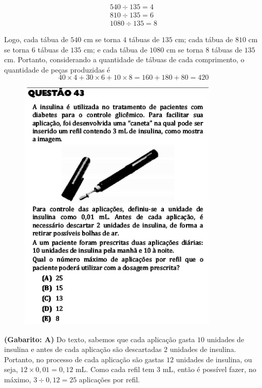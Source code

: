 \documentclass[a4paper]{article}
\begin{document}
\begin{align*}
540\div 135 = 4\\
810\div 135 = 6\\
1080\div 135 = 8
\end{align*}
\par\vspace{0.3cm} Logo, cada tábua de $540$ cm se torna $4$ tábuas de $135$ cm; cada tábua de $810$ cm se torna $6$ tábuas de $135$ cm; e cada tábua de $1080$ cm se torna $8$ tábuas de $135$ cm. Portanto, considerando a quantidade de tábuas de cada comprimento, o quantidade de peças produzidas é
\begin{equation*}
40\times 4 + 30\times 6 + 10\times 8 = 160+180+80 = 420
\end{equation*}
\begin{figure}[H]
	\begin{center}
		\includegraphics[width=9.5cm]{L2Q43.png}
	\end{center}
\end{figure}
\par\textbf{(Gabarito: A)} Do texto, sabemos que cada aplicação gasta $10$ unidades de insulina e antes de cada aplicação são descartadas $2$ unidades de insulina. Portanto, no processo de cada aplicação são gastas $12$ unidades de insulina, ou seja, $12\times 0,01 = 0,12\text{ mL}$. Como cada refil tem $3$ mL, então é possível fazer, no máximo, $3\div0,12 = 25$ aplicações por refil.
\end{document}
